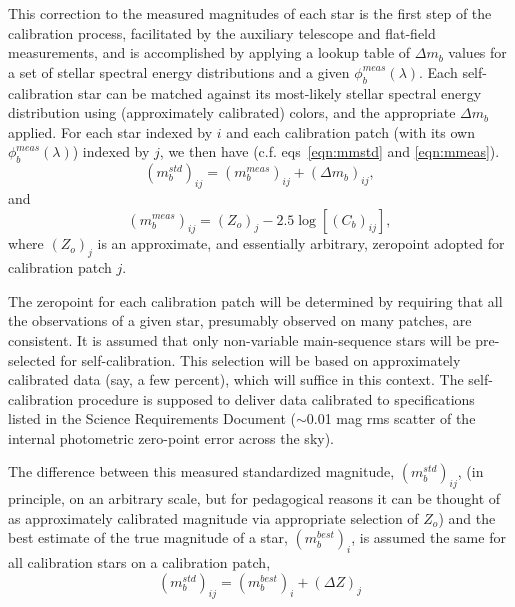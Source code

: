 \documentclass[12pt,preprint]{aastex}
\begin{document}
This correction to the measured magnitudes of each star is the first step of the 
calibration process, facilitated by the auxiliary telescope and flat-field measurements,
and is accomplished by applying a lookup 
table of $\Delta m_b$ values for a set of stellar spectral energy distributions and
a given $\phi_b^{meas}(\lambda)$. Each self-calibration star can be matched against
its most-likely stellar spectral energy distribution using (approximately calibrated) colors, and the appropriate
$\Delta m_b$ applied. For each star indexed by $i$ and each calibration patch (with its
own $\phi_b^{meas}(\lambda)$) indexed by $j$, we then have (c.f. eqs~\ref{eqn:mmstd} and \ref{eqn:mmeas}). 
\begin{equation}
\label{Eq:obsMag}
          (m_b^{std})_{ij} =  (m_b^{meas})_{ij} + (\Delta m_b)_{ij},
\end{equation}
and
\begin{equation}
\label{Eq:rawMag}
       (m_b^{meas})_{ij} =  (Z_o)_j  -2.5\log[(C_b)_{ij}], 
\end{equation}
where $(Z_o)_j$ is an approximate, and essentially arbitrary, zeropoint adopted
for calibration patch $j$. 

The zeropoint for each calibration patch will be determined by requiring 
that all the observations of a given star, presumably observed on 
many patches, are consistent. It is assumed that only non-variable 
main-sequence stars will be pre-selected for self-calibration. This selection
will be based on approximately calibrated data (say, a few percent),
which will suffice in this context.  The self-calibration procedure
is supposed to deliver data calibrated to specifications listed in
the Science Requirements Document ($\sim$0.01 mag rms scatter of the
internal photometric zero-point error across the sky).

The difference between this measured standardized magnitude, $(m_b^{std})_{ij}$, 
(in principle, on an arbitrary scale, but for pedagogical reasons it can be thought 
of as approximately calibrated magnitude via appropriate selection of $Z_o$) and 
the best estimate of the true magnitude of a star, $(m_b^{best})_{i}$, is assumed the same for all 
calibration stars on a calibration patch, 
\begin{equation}
\label{Eq:ZP}
   (m_b^{std})_{ij} = (m_b^{best})_{i} + (\Delta Z)_j
\end{equation}
\end{document}
